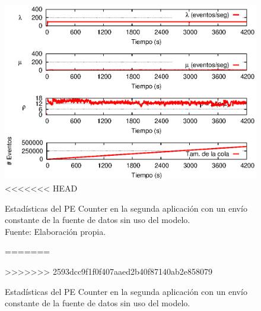 \begin{figure}[!ht]
    \centering
    \captionsetup{justification=centering}
    \includegraphics[scale=1]{images/exp/app2/uniform/sm/statusCounterPE.eps}
<<<<<<< HEAD
    \caption[Estadísticas del PE Counter en la segunda aplicación con un envío constante de la fuente de datos sin uso del modelo.]{Estadísticas del PE Counter en la segunda aplicación con un envío constante de la fuente de datos sin uso del modelo.\\Fuente: Elaboración propia.}
=======
    \caption{Estad\'isticas del PE Counter en la segunda aplicaci\'on con un env\'io constante de la fuente de datos sin uso del modelo.}
>>>>>>> 2593dcc9f1f0f407aaed2b40f87140ab2e858079
    \label{fig:app2-uniform-statusCounterPE-sm}
\end{figure}

